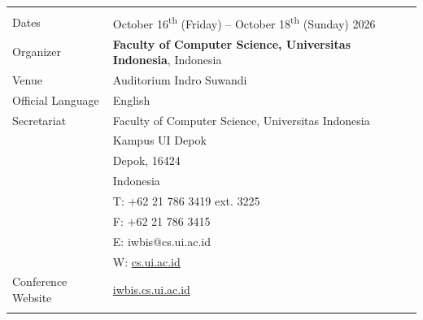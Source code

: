 \documentclass[10pt,a4paper]{article}
\begin{document}
\newpage
\vspace*{1cm}

\noindent
\renewcommand{\arraystretch}{1.3}
\setlength{\tabcolsep}{14pt}

\begin{center}
\begin{tabularx}{0.85\textwidth}{@{}>{\raggedright\arraybackslash}p{3.4cm} >{\raggedright\arraybackslash}X@{}}
  
  \rowcolor{lightgraybg} & \\[-6pt] %
  
  \rowcolor{lightgraybg}
  Dates & October 16\textsuperscript{th} (Friday) -- October 18\textsuperscript{th} (Sunday) 2026 \\[4pt]
  
  \rowcolor{lightgraybg}
  Organizer & \textbf{Faculty of Computer Science, Universitas Indonesia}, Indonesia \\ [4pt]
  
  \rowcolor{lightgraybg}
  Venue & Auditorium Indro Suwandi \\[4pt]
  
  \rowcolor{lightgraybg}
  Official Language & English \\[4pt]
  
  \rowcolor{lightgraybg}
  Secretariat & Faculty of Computer Science, Universitas Indonesia \\
  \rowcolor{lightgraybg}
  & Kampus UI Depok \\
  \rowcolor{lightgraybg}
  & Depok, 16424 \\
  \rowcolor{lightgraybg}
  & Indonesia \\
  \rowcolor{lightgraybg}
  & T: +62 21 786 3419 ext. 3225 \\
  \rowcolor{lightgraybg}
  & F: +62 21 786 3415 \\
  \rowcolor{lightgraybg}
  & E: iwbis@cs.ui.ac.id \\
  \rowcolor{lightgraybg}
  & W: \url{cs.ui.ac.id} \\[4pt]
  
  \rowcolor{lightgraybg}
  Conference Website & \url{iwbis.cs.ui.ac.id} \\

  
  \rowcolor{lightgraybg} & \\[-6pt] %
\end{tabularx}
\end{center}
\end{document}
